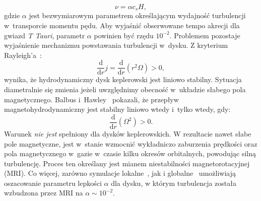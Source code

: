 \begin{equation}\label{eq:alpha}
\nu = \alpha c_s H,
\end{equation}
%
gdzie $\alpha$ jest bezwymiarowym parametrem określającym wydajność
turbulencji w~transporcie momentu pędu. Aby wyjaśnić obserwowane tempo akrecji
dla gwiazd \emph{T Tauri}, parametr $\alpha$ powinien być rzędu $10^{-2}$.
Problemem pozostaje wyjaśnienie mechanizmu powstawania turbulencji w~dysku. Z
kryterium Rayleigh'a~\cite{C61}:
%
\begin{equation}
   \frac{\mathrm{d}}{\mathrm{d}r} j =
   \frac{\mathrm{d}}{\mathrm{d}r}\left(r^2\Omega\right) > 0,
\end{equation}
%
wynika, że hydrodynamiczny dysk keplerowski jest liniowo stabilny. Sytuacja
diametralnie się zmienia jeżeli uwzględnimy obecność w~układzie 
słabego pola magnetycznego. Balbus i~Hawley~\citep{BH91} pokazali, że przepływ
magnetohydrodynamiczny jest stabilny liniowo wtedy i~tylko wtedy, gdy:
%
\begin{equation}\label{eq:mri}
   \frac{\mathrm{d}}{\mathrm{d}r}\left(\Omega^2\right) > 0.
\end{equation}
%
Warunek  \emph{nie jest} spełniony dla dysków keplerowskich. W
rezultacie nawet słabe pole magnetyczne, jest w~stanie wzmocnić wykładniczo
zaburzenia prędkości oraz pola magnetycznego w~gazie w~czasie kilku okresów
orbitalnych, powodując silną turbulencję. Proces ten określany jest mianem
niestabilności magnetorotacyjnej (MRI). Co więcej, zarówno symulacje
lokalne~\cite{DSP10}, jak i globalne~\cite{FD11} umożliwiają oszacowanie
parametru lepkości $\alpha$ dla dysku, w którym turbulencja została wzbudzona
przez MRI na $\alpha\sim 10^{-2}$.


